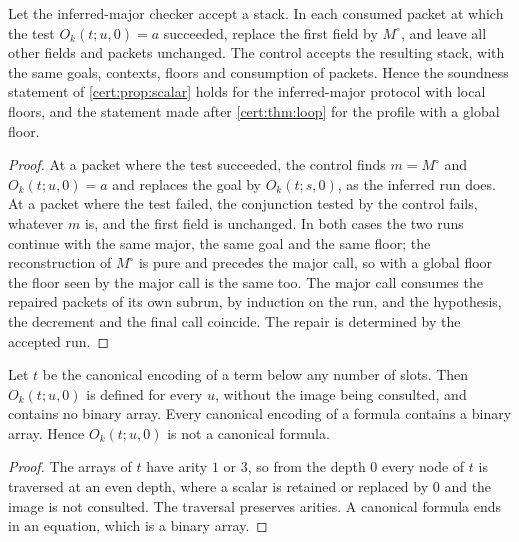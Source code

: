 \begin{theorem}[Repair]\label{cert:thm:inferred-sound}
Let the inferred-major checker accept a stack. In each consumed packet at
which the test $O_k(t;u,0)=a$ succeeded, replace the first field by
$M^{\circ}$, and leave all other fields and packets unchanged. The control
accepts the resulting stack, with the same goals, contexts, floors and
consumption of packets. Hence the soundness statement of
\cref{cert:prop:scalar} holds for the inferred-major protocol with local
floors, and the statement made after \cref{cert:thm:loop} for the profile with
a global floor.
\end{theorem}
\begin{proof}
At a packet where the test succeeded, the control finds $m=M^{\circ}$ and
$O_k(t;u,0)=a$ and replaces the goal by $O_k(t;s,0)$, as the inferred run
does. At a packet where the test failed, the conjunction tested by the
control fails, whatever $m$ is, and the first field is unchanged. In both
cases the two runs continue with the same major, the same goal and the same
floor; the reconstruction of $M^{\circ}$ is pure and precedes the major call,
so with a global floor the floor seen by the major call is the same too. The
major call consumes the repaired packets of its own subrun, by induction on
the run, and the hypothesis, the decrement and the final call coincide. The
repair is determined by the accepted run.
\end{proof}

\begin{lemma}\label{cert:lem:separation}
Let $t$ be the canonical encoding of a term below any number of slots. Then
$O_k(t;u,0)$ is defined for every $u$, without the image being consulted, and
contains no binary array. Every canonical encoding of a formula contains a
binary array. Hence $O_k(t;u,0)$ is not a canonical formula.
\end{lemma}
\begin{proof}
The arrays of $t$ have arity $1$ or $3$, so from the depth $0$ every node of
$t$ is traversed at an even depth, where a scalar is retained or replaced by
$0$ and the image is not consulted. The traversal preserves arities. A
canonical formula ends in an equation, which is a binary array.
\end{proof}

